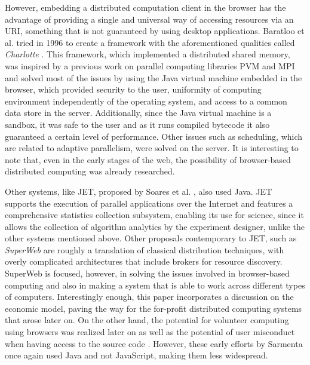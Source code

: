 \documentclass{sig-alternate}
\begin{document}
However, embedding a
distributed computation client in the browser has the advantage of
providing a single and universal way of accessing resources via an
URI, something that is not guaranteed by using desktop applications. 
Baratloo et al. tried in 1996 to create a framework with
the aforementioned qualities called {\em Charlotte}
\cite{baratloo1999charlotte}. This framework, which implemented a
distributed shared memory, was inspired by a previous work
on parallel computing libraries PVM and MPI and solved most of the issues by
using the Java virtual machine embedded in the browser,
which provided
security to the user, uniformity of computing environment
independently of the operating system, and access to a common data store in the
server. Additionally, since the Java virtual machine is a sandbox, it was safe to the user
and as it runs compiled bytecode it also guaranteed a certain level of
performance. %
Other issues such as scheduling, which are related to adaptive 
parallelism, were solved on the server. It is interesting to note that,
even in the early stages of the web, the possibility of
browser-based distributed computing was already researched. 


Other systems, like JET, proposed by Soares et
al. \cite{soares1998get}, also used Java. JET supports
the execution of parallel applications over the Internet and features
a comprehensive statistics collection subsystem, enabling its use for science, %
since it allows %
the collection of algorithm analytics by the
experiment designer, unlike the other systems mentioned
above. Other proposals contemporary to JET, such as {\em SuperWeb}
\cite{alexandrov1997superweb} are roughly a translation of classical
distribution techniques, with overly complicated architectures that include
brokers for resource discovery. SuperWeb is focused,
however, in solving the
issues involved in browser-based computing and also in making a system
that is able to work across different types of computers. Interestingly enough, this
paper incorporates a discussion on the economic model, paving the way
for the for-profit distributed computing systems that arose later on. 
On the other hand, the potential for volunteer computing using
browsers was realized
later on \cite{sarmenta-bayanihan} as well as the potential of
user misconduct when having access to the source code \cite{sarmenta-sabotagetolerance}. 
However, these early efforts by
Sarmenta once again used Java and not JavaScript, making them %
less widespread.
\end{document}
